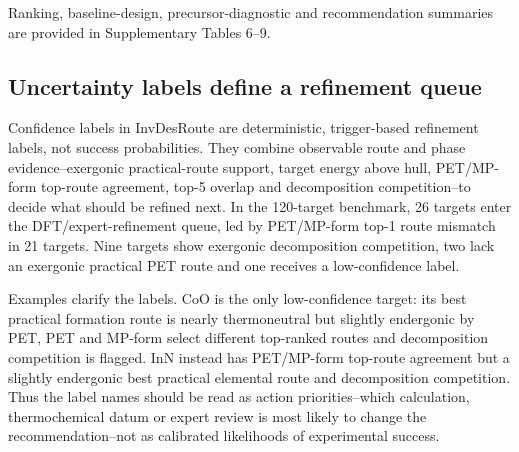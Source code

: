 \documentclass[11pt, letterpaper]{article}
\newcommand{\invdesroute}{InvDesRoute}
\begin{document}
\noindent Ranking, baseline-design, precursor-diagnostic and recommendation summaries are provided in Supplementary Tables 6--9.

\subsection*{Uncertainty labels define a refinement queue}

Confidence labels in \invdesroute{} are deterministic, trigger-based refinement labels, not success probabilities. They combine observable route and phase evidence--exergonic practical-route support, target energy above hull, PET/MP-form top-route agreement, top-5 overlap and decomposition competition--to decide what should be refined next. In the 120-target benchmark, 26 targets enter the DFT/expert-refinement queue, led by PET/MP-form top-1 route mismatch in 21 targets. Nine targets show exergonic decomposition competition, two lack an exergonic practical PET route and one receives a low-confidence label.

Examples clarify the labels. CoO is the only low-confidence target: its best practical formation route is nearly thermoneutral but slightly endergonic by PET, PET and MP-form select different top-ranked routes and decomposition competition is flagged. InN instead has PET/MP-form top-route agreement but a slightly endergonic best practical elemental route and decomposition competition. Thus the label names should be read as action priorities--which calculation, thermochemical datum or expert review is most likely to change the recommendation--not as calibrated likelihoods of experimental success.
\end{document}
